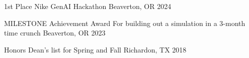 



\begin{cvhonors}


\cvhonor
{1st Place} %
{Nike GenAI Hackathon} %
{Beaverton, OR} %
{2024} %


\cvhonor
{MILESTONE Achievement Award} %
{For building out a simulation in a 3-month time crunch} %
{Beaverton, OR} %
{2023} %


\cvhonor
{Honors} %
{Dean's list for Spring and Fall} %
{Richardon, TX} %
{2018} %


\end{cvhonors}
